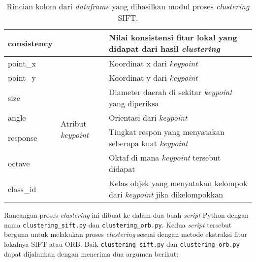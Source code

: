 \begin{table}[H]
\begin{tabular}{|p{}|p{}|p{}|}
		consistency     &                                           & Nilai konsistensi fitur lokal yang didapat dari hasil \textit{clustering}                                            \\ \hline
		point\_x    & \multirow{7}{*}{Atribut \textit{keypoint}}         & Koordinat x dari \textit{keypoint}                                                                                   \\ \cline{1-1} \cline{3-3} 
		point\_y    &                                           & Koordinat y dari \textit{keypoint}                                                                                   \\ \cline{1-1} \cline{3-3} 
		size            &                                           & Diameter daerah di sekitar \textit{keypoint} yang diperiksa                                                          \\ \cline{1-1} \cline{3-3} 
		angle           &                                           & Orientasi dari \textit{keypoint}                                                                                     \\ \cline{1-1} \cline{3-3} 
		response        &                                           & Tingkat respon yang menyatakan seberapa kuat \textit{keypoint}                                                       \\ \cline{1-1} \cline{3-3} 
		octave          &                                           & Oktaf di mana \textit{keypoint} tersebut didapat                                                                     \\ \cline{1-1} \cline{3-3} 
		class\_id       &                                           & Kelas objek yang menyatakan kelompok dari \textit{keypoint} jika dikelompokkan                                       \\ \hline
	\end{tabular}
	\caption{Rincian kolom dari \textit{dataframe} yang dihasilkan modul proses \textit{clustering} SIFT.}
	\label{tab:df_clustering}
\end{table}
Rancangan proses \textit{clustering} ini dibuat ke dalam dua buah \textit{script} Python dengan nama \texttt{clustering\_sift.py} dan \texttt{clustering\_orb.py}. Kedua \textit{script} tersebut berguna untuk melakukan proses \textit{clustering} sesuai dengan metode ekstraksi fitur lokalnya SIFT atau ORB. Baik \texttt{clustering\_sift.py} dan \texttt{clustering\_orb.py} dapat dijalankan dengan menerima dua argumen berikut:
